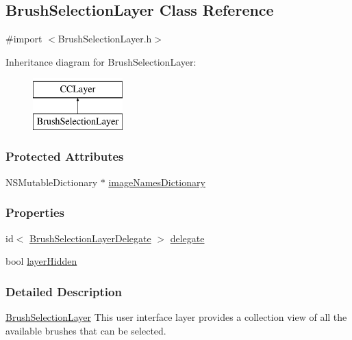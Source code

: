 \hypertarget{interface_brush_selection_layer}{\subsection{Brush\-Selection\-Layer Class Reference}
\label{d5/d83/interface_brush_selection_layer}
}


{\ttfamily \#import $<$Brush\-Selection\-Layer.\-h$>$}

Inheritance diagram for Brush\-Selection\-Layer\-:\begin{figure}[H]
\begin{center}
\leavevmode
\includegraphics[height=2.000000cm]{d5/d83/interface_brush_selection_layer}
\end{center}
\end{figure}
\subsubsection*{Protected Attributes}
\begin{DoxyCompactItemize}
\item 
N\-S\-Mutable\-Dictionary $\ast$ \hyperlink{interface_brush_selection_layer_a4ec74d274a54411ce95f3168ee5823ba}{image\-Names\-Dictionary}
\end{DoxyCompactItemize}
\subsubsection*{Properties}
\begin{DoxyCompactItemize}
\item 
id$<$ \hyperlink{protocol_brush_selection_layer_delegate-p}{Brush\-Selection\-Layer\-Delegate} $>$ \hyperlink{interface_brush_selection_layer_a777a4f065988aee06e9a46ccd0ffb10a}{delegate}
\item 
bool \hyperlink{interface_brush_selection_layer_aaf6677a075014de2c2b0abe254b241a6}{layer\-Hidden}
\end{DoxyCompactItemize}


\subsubsection{Detailed Description}
\hyperlink{interface_brush_selection_layer}{Brush\-Selection\-Layer} This user interface layer provides a collection view of all the available brushes that can be selected. 

